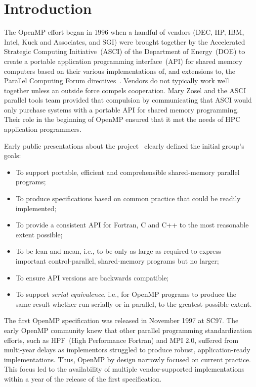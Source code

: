 \section{Introduction}
\label{sec:intro}

The OpenMP effort began in 1996 when a handful of vendors (DEC, HP, IBM, Intel,
Kuck and Associates, and SGI) were brought together by the Accelerated Strategic
Computing Initiative~(ASCI) of the Department of Energy~(DOE) to create a
portable application programming interface~(API) for shared memory computers
based on their various implementations of, and extensions to, the Parallel
Computing Forum directives~\cite{TheParallelComputingForum}. Vendors do not
typically work well together unless an outside force compels cooperation. Mary
Zosel and the ASCI parallel tools team provided that compulsion by communicating
that ASCI would only purchase systems with a portable API for shared memory
programming. Their role in the beginning of OpenMP ensured that it met the needs
of HPC application programmers.

Early public presentations about the project~\cite{ewomp99} clearly
defined the initial group's goals:

\begin{itemize}
  \item To support portable, efficient and comprehensible shared-memory 
        parallel programs;
  \item To produce specifications based on common practice that 
        could be readily implemented;
  \item To provide a consistent API for Fortran, C and C++ to the 
        most reasonable extent possible;
  \item To be lean and mean, i.e., to  be only as large as required 
        to express important control-parallel, shared-memory programs  
        but no larger;
  \item To ensure API versions are backwards compatible;
  \item To support \emph{serial equivalence}, i.e., for OpenMP 
        programs to produce the same result whether run serially or in
        parallel, to the greatest possible extent.
\end{itemize}

The first OpenMP specification  was released in November 1997 at SC97. The
early OpenMP community knew that other parallel programming  standardization 
efforts, such as HPF~(High Performance Fortran) and MPI 2.0, suffered from 
multi-year delays as implementors struggled to produce robust, 
application-ready implementations. Thus, OpenMP by design narrowly focused 
on current practice. This focus led to the availability of multiple
vendor-supported implementations within a year of the release of the 
first specification. 

